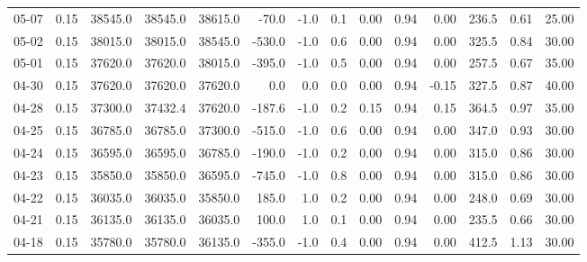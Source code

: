 \begin{threeparttable}
{\begin{tabular}{lrrrrrrrrrrrrr}
  05-07 &     0.15 & 38545.0 & 38545.0 & 38615.0 &      -70.0 &                     -1.0 &                 0.1 &       0.00 &      0.94 &           0.00 &            236.5 &            0.61 &                  25.00 \\
  05-02 &     0.15 & 38015.0 & 38015.0 & 38545.0 &     -530.0 &                     -1.0 &                 0.6 &       0.00 &      0.94 &           0.00 &            325.5 &            0.84 &                  30.00 \\
  05-01 &     0.15 & 37620.0 & 37620.0 & 38015.0 &     -395.0 &                     -1.0 &                 0.5 &       0.00 &      0.94 &           0.00 &            257.5 &            0.67 &                  35.00 \\
  04-30 &     0.15 & 37620.0 & 37620.0 & 37620.0 &        0.0 &                      0.0 &                 0.0 &       0.00 &      0.94 &          -0.15 &            327.5 &            0.87 &                  40.00 \\
  04-28 &     0.15 & 37300.0 & 37432.4 & 37620.0 &     -187.6 &                     -1.0 &                 0.2 &       0.15 &      0.94 &           0.15 &            364.5 &            0.97 &                  35.00 \\
  04-25 &     0.15 & 36785.0 & 36785.0 & 37300.0 &     -515.0 &                     -1.0 &                 0.6 &       0.00 &      0.94 &           0.00 &            347.0 &            0.93 &                  30.00 \\
  04-24 &     0.15 & 36595.0 & 36595.0 & 36785.0 &     -190.0 &                     -1.0 &                 0.2 &       0.00 &      0.94 &           0.00 &            315.0 &            0.86 &                  30.00 \\
  04-23 &     0.15 & 35850.0 & 35850.0 & 36595.0 &     -745.0 &                     -1.0 &                 0.8 &       0.00 &      0.94 &           0.00 &            315.0 &            0.86 &                  30.00 \\
  04-22 &     0.15 & 36035.0 & 36035.0 & 35850.0 &      185.0 &                      1.0 &                 0.2 &       0.00 &      0.94 &           0.00 &            248.0 &            0.69 &                  30.00 \\
  04-21 &     0.15 & 36135.0 & 36135.0 & 36035.0 &      100.0 &                      1.0 &                 0.1 &       0.00 &      0.94 &           0.00 &            235.5 &            0.66 &                  30.00 \\
  04-18 &     0.15 & 35780.0 & 35780.0 & 36135.0 &     -355.0 &                     -1.0 &                 0.4 &       0.00 &      0.94 &           0.00 &            412.5 &            1.13 &                  30.00 \\

\end{tabular}}
\end{threeparttable}

